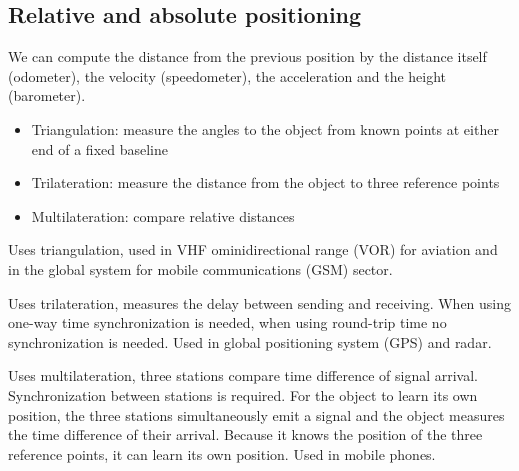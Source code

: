 \subsection{Relative and absolute positioning}
\begin{mytitle} We can compute the distance from the previous position by the distance itself (odometer), the velocity (speedometer), the acceleration and the height (barometer).
\end{mytitle}
\begin{mytitle}\hfill
\begin{itemize}
    \item Triangulation: measure the angles to the object from known points at either end of a fixed baseline
    \item Trilateration: measure the distance from the object to three reference points
    \item Multilateration: compare relative distances
\end{itemize}
\end{mytitle}
\begin{mytitle} Uses triangulation, used in VHF ominidirectional range (VOR) for aviation and in the global system for mobile communications (GSM) sector.
\end{mytitle}
\begin{mytitle} Uses trilateration, measures the delay between sending and receiving. When using one-way time synchronization is needed, when using round-trip time no synchronization is needed. Used in global positioning system (GPS) and radar.
\end{mytitle}
\begin{mytitle} Uses multilateration, three stations compare time difference of signal arrival. Synchronization between stations is required. For the object to learn its own position, the three stations simultaneously emit a signal and the object measures the time difference of their arrival. Because it knows the position of the three reference points, it can learn its own position. Used in mobile phones.
\end{mytitle}

